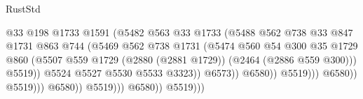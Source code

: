 \begin{lexlean}{RustStd}
\begin{coremodule}
                                                @33
                                                @198
                                                @1733
                                                @1591
                                                (@5482
                                                  @563
                                                  @33
                                                  @1733
                                                  (@5488
                                                    @562
                                                    @738
                                                    @33
                                                    @847
                                                    @1731
                                                    @863
                                                    @744
                                                    (@5469
                                                      @562
                                                      @738
                                                      @1731
                                                      (@5474
                                                        @560
                                                        @54
                                                        @300
                                                        @35
                                                        @1729
                                                        @860
                                                        (@5507
                                                          @559
                                                          @1729
                                                          (@2880 (@2881 @1729))
                                                          (@2464 (@2886 @559 @300)))
                                                        @5519))
                                                    @5524
                                                    @5527
                                                    @5530
                                                    @5533
                                                    @3323))
                                                @6573))
                                            @6580))
                                        @5519)))
                                  @6580))
                              @5519)))
                        @6580))
                    @5519)))
              @6580))
          @5519)))

\end{coremodule}
\end{lexlean}
